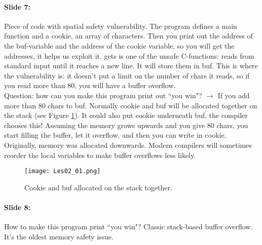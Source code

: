 \documentclass[10pt,a4paper]{report}
\begin{document}
\paragraph{Slide 7:} Piece of code with spatial safety vulnerability. The program defines a main function and a cookie, an array of characters. Then you print out the address of the buf-variable and the address of the cookie variable, so you will get the addresses, it helps us exploit it. gets is one of the unsafe C-functions: reads from standard input until it reaches a new line. It will store them in buf. This is where the vulnerability is: it doesn't put a limit on the number of chars it reads, so if you read more than 80, you will have a buffer overflow.\\
Question: how can you make this program print out ``you win"? $\rightarrow$ If you add more than 80 chars to buf. Normally cookie and buf will be allocated together on the stack (see Figure \ref{les02_01}). It could also put cookie underneath buf, the compiler chooses this! Assuming the memory grows upwards and you give 80 chars, you start filling the buffer, let it overflow, and then you can write in cookie. Originally, memory was allocated downwards. Modern compilers will sometimes reorder the local variables to make buffer overflows less likely.

\begin{figure}[ht!]
\centering
\texttt{[image: Les02\_01.png]}
\caption{Cookie and buf allocated on the stack together.} 
\label{les02_01}
\end{figure}

\paragraph{Slide 8:} How to make this program print ``you win"? Classic stack-based buffer overflow. It's the oldest memory safety issue.
\end{document}
